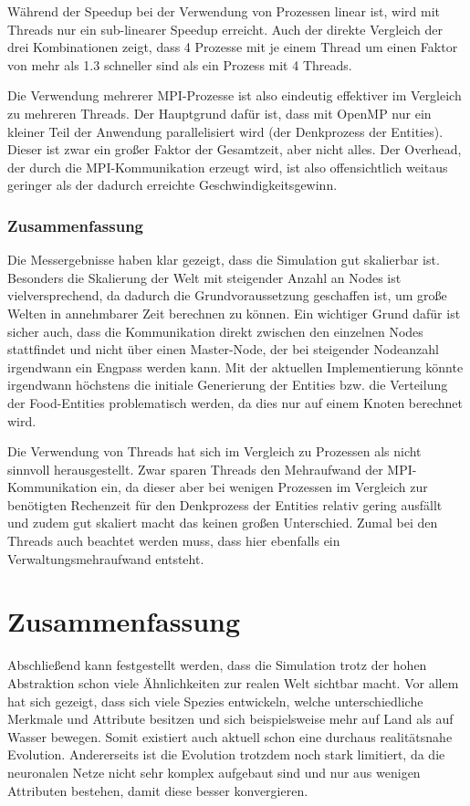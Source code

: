 \documentclass[course=erap]{aspdoc}
\begin{document}
Während der Speedup bei der Verwendung von Prozessen linear ist, wird mit Threads nur ein sub-linearer Speedup erreicht. Auch der direkte Vergleich der drei Kombinationen zeigt, dass 4 Prozesse mit je einem Thread um einen Faktor von mehr als 1.3 schneller sind als ein Prozess mit 4 Threads.

Die Verwendung mehrerer MPI-Prozesse ist also eindeutig effektiver im Vergleich zu mehreren Threads. Der Hauptgrund dafür ist, dass mit OpenMP nur ein kleiner Teil der Anwendung parallelisiert wird (der Denkprozess der Entities). Dieser ist zwar ein großer Faktor der Gesamtzeit, aber nicht alles. Der Overhead, der durch die MPI-Kommunikation erzeugt wird, ist also offensichtlich weitaus geringer als der dadurch erreichte Geschwindigkeitsgewinn.

\subsubsection{Zusammenfassung}
Die Messergebnisse haben klar gezeigt, dass die Simulation gut skalierbar ist. Besonders die Skalierung der Welt mit steigender Anzahl an Nodes ist vielversprechend, da dadurch die Grundvoraussetzung geschaffen ist, um große Welten in annehmbarer Zeit berechnen zu können. Ein wichtiger Grund dafür ist sicher auch, dass die Kommunikation direkt zwischen den einzelnen Nodes stattfindet und nicht über einen Master-Node, der bei steigender Nodeanzahl irgendwann ein Engpass werden kann. Mit der aktuellen Implementierung könnte irgendwann höchstens die initiale Generierung der Entities bzw. die Verteilung der Food-Entities problematisch werden, da dies nur auf einem Knoten berechnet wird.

Die Verwendung von Threads hat sich im Vergleich zu Prozessen als nicht sinnvoll herausgestellt. Zwar sparen Threads den Mehraufwand der MPI-Kommunikation ein, da dieser aber bei wenigen Prozessen im Vergleich zur benötigten Rechenzeit für den Denkprozess der Entities relativ gering ausfällt und zudem gut skaliert macht das keinen großen Unterschied. Zumal bei den Threads auch beachtet werden muss, dass hier ebenfalls ein Verwaltungsmehraufwand entsteht.

\newpage
\section{Zusammenfassung}
Abschließend kann festgestellt werden, dass die Simulation trotz der hohen Abstraktion schon viele Ähnlichkeiten zur realen Welt sichtbar macht. Vor allem hat sich gezeigt, dass sich viele Spezies entwickeln, welche unterschiedliche Merkmale und Attribute besitzen und sich beispielsweise mehr auf Land als auf Wasser bewegen. Somit existiert auch aktuell schon eine durchaus realitätsnahe Evolution. Andererseits ist die Evolution trotzdem noch stark limitiert, da die neuronalen Netze nicht sehr komplex aufgebaut sind und nur aus wenigen Attributen bestehen, damit diese besser konvergieren.
\end{document}
